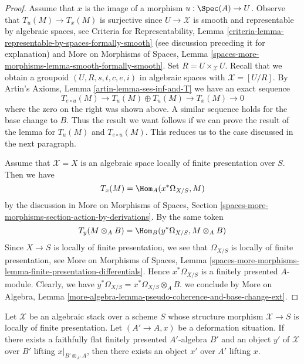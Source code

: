 \begin{proof}
\medskip\noindent
Assume that $x$ is the image of a morphism $u : \Spec(A) \to U$.
Observe that $T_u(M) \to T_x(M)$ is surjective since
$U \to \mathcal{X}$ is smooth and representable by
algebraic spaces, see Criteria for Representability, Lemma
\ref{criteria-lemma-representable-by-spaces-formally-smooth}
(see discussion preceding it for explanation) and
More on Morphisms of Spaces, Lemma
\ref{spaces-more-morphisms-lemma-smooth-formally-smooth}.
Set $R = U \times_\mathcal{X} U$. Recall that we obtain
a groupoid $(U, R, s, t, c, e, i)$ in algebraic spaces with
$\mathcal{X} = [U/R]$. By
Artin's Axioms, Lemma \ref{artin-lemma-ses-inf-and-T}
we have an exact sequence
$$
T_{e \circ u}(M) \to T_u(M) \oplus T_u(M) \to T_x(M) \to 0
$$
where the zero on the right was shown above. A similar sequence
holds for the base change to $B$. Thus the result we want follows if
we can prove the result of the lemma for
$T_u(M)$ and $T_{e \circ u}(M)$. This reduces us to the case discussed
in the next paragraph.

\medskip\noindent
Assume that $\mathcal{X} = X$ is an algebraic space locally of finite
presentation over $S$. Then we have
$$
T_x(M) = \Hom_A(x^*\Omega_{X/S}, M)
$$
by the discussion in More on Morphisms of Spaces, Section
\ref{spaces-more-morphisms-section-action-by-derivations}.
By the same token
$$
T_y(M \otimes_A B) = \Hom_B(y^*\Omega_{X/S}, M \otimes_A B)
$$
Since $X \to S$ is locally of finite presentation, we see that
$\Omega_{X/S}$ is locally of finite presentation, see
More on Morphisms of Spaces, Lemma
\ref{spaces-more-morphisms-lemma-finite-presentation-differentials}.
Hence $x^*\Omega_{X/S}$ is a finitely presented $A$-module.
Clearly, we have $y^*\Omega_{X/S} = x^*\Omega_{X/S} \otimes_A B$.
we conclude by More on Algebra, Lemma
\ref{more-algebra-lemma-pseudo-coherence-and-base-change-ext}.
\end{proof}

\begin{lemma}
\label{lemma-local-lift-enough}
Let $\mathcal{X}$ be an algebraic stack over a scheme $S$ whose
structure morphism $\mathcal{X} \to S$ is locally of finite presentation.
Let $(A' \to A, x)$ be a deformation situation. If there exists a
faithfully flat finitely presented $A'$-algebra $B'$ and an
object $y'$ of $\mathcal{X}$ over $B'$ lifting $x|_{B' \otimes_{A'} A}$,
then there exists an object $x'$ over $A'$ lifting $x$.
\end{lemma}

